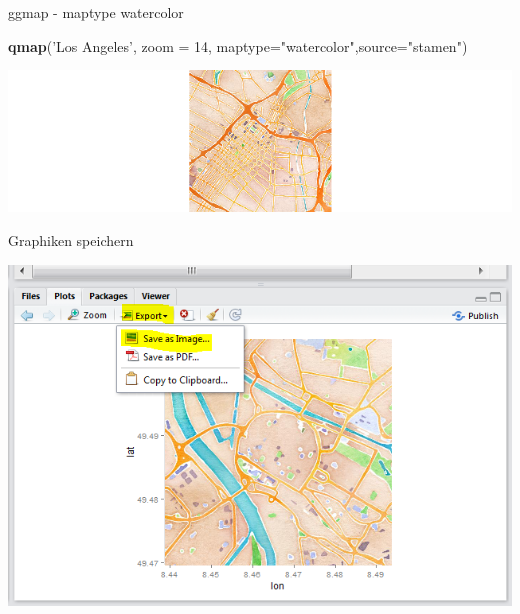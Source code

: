 \documentclass[ignorenonframetext,]{beamer}
\newenvironment{Shaded}{\begin{snugshade}}{\end{snugshade}}
\newcommand{\KeywordTok}[1]{\textcolor[rgb]{0.13,0.29,0.53}{\textbf{#1}}}
\newcommand{\DataTypeTok}[1]{\textcolor[rgb]{0.13,0.29,0.53}{#1}}
\newcommand{\DecValTok}[1]{\textcolor[rgb]{0.00,0.00,0.81}{#1}}
\newcommand{\StringTok}[1]{\textcolor[rgb]{0.31,0.60,0.02}{#1}}
\newcommand{\NormalTok}[1]{#1}
\begin{document}
\begin{frame}[fragile]{ggmap - maptype watercolor}

\begin{Shaded}
\begin{Highlighting}[]
\KeywordTok{qmap}\NormalTok{(}\StringTok{'Los Angeles'}\NormalTok{, }\DataTypeTok{zoom =} \DecValTok{14}\NormalTok{,}
 \DataTypeTok{maptype=}\StringTok{"watercolor"}\NormalTok{,}\DataTypeTok{source=}\StringTok{"stamen"}\NormalTok{)}
\end{Highlighting}
\end{Shaded}

\includegraphics{figure/lastamen.png}

\end{frame}

\begin{frame}{Graphiken speichern}

\includegraphics{figure/RstudioExport.PNG}

\end{frame}
\end{document}
